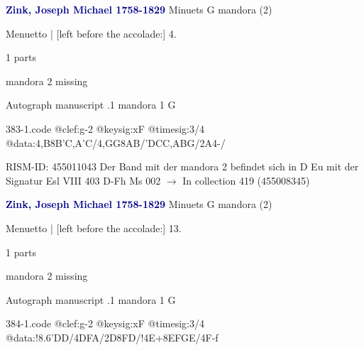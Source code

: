 \documentclass[twocolumn]{book}
\begin{document}
\newline \par \vspace{7pt} \textcolor{darkblue}{\textbf{Zink, Joseph Michael  1758-1829}}
\newline Minuets  G  
\newline mandora (2)
\newline \begin{itshape}[f.7v, at left:] Menuetto | [left before the accolade:] 4.\end{itshape} 
\newline \textcolor{darkblue}{}  1 parts  
\newline \begin{small} mandora 2 missing\end{small} 
\newline Autograph manuscript
.1  mandora 1  G  
\begin{filecontents*}{383-1.code}
@clef:g-2
@keysig:xF
@timesig:3/4
@data:4,B8B'C,A'C/4,GG{8AB}/'DCC,ABG/2A4-/
\end{filecontents*}
\newline
%

\newline RISM-ID: 455011043
\newline Der Band mit der mandora 2 befindet sich in D Eu mit der Signatur Esl VIII 403
\newline D-Fh  Ms 002
\newline $\rightarrow$ In collection 419 (455008345)

\newline \par \vspace{7pt} \textcolor{darkblue}{\textbf{Zink, Joseph Michael  1758-1829}}
\newline Minuets  G  
\newline mandora (2)
\newline \begin{itshape}[f.10v, at left:] Menuetto | [left before the accolade:] 13.\end{itshape} 
\newline \textcolor{darkblue}{}  1 parts  
\newline \begin{small} mandora 2 missing\end{small} 
\newline Autograph manuscript
.1  mandora 1  G  
\begin{filecontents*}{384-1.code}
@clef:g-2
@keysig:xF
@timesig:3/4
@data:!{8.6'DD}/4DFA/2D{8FD}/!4E+{8EFGE}/4F-f
\end{filecontents*}
\newline
%
\end{document}
